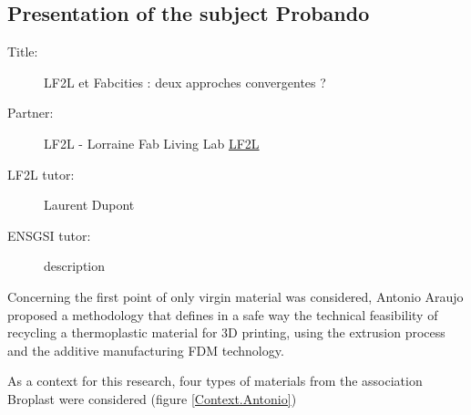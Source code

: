 \subsection{Presentation of the subject Probando}



\begin{description}
	\item[Title:] LF2L et Fabcities : deux approches convergentes ?  
	\item[Partner:] LF2L 	- Lorraine Fab Living Lab \href{http://www.lf2l.fr}{LF2L}			

	\item[LF2L tutor:] Laurent Dupont 
	\item[ENSGSI tutor:] description
\end{description}

Concerning the first point of only virgin material was considered, Antonio Araujo proposed a methodology that defines in a safe way the technical feasibility of recycling a thermoplastic material for 3D printing, using the extrusion process and the additive manufacturing FDM technology.

As a context for this research, four types of materials from the association Broplast were considered (figure \ref{Context.Antonio})




%	
%
%	
